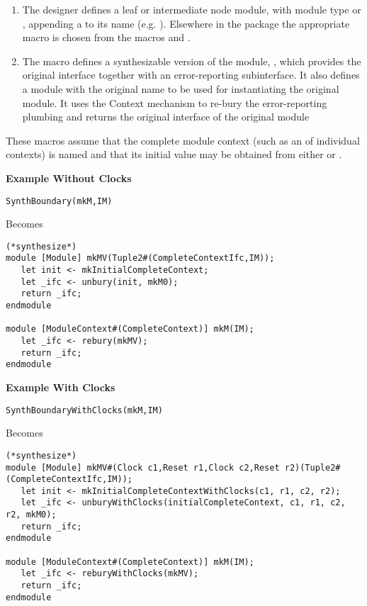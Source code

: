 \begin{enumerate}
\item The designer defines a leaf or intermediate node module, with
module type \te{[ErrorReporter]} or \te{[ErrorReporterA]}, appending a
 to its name (e.g. ).  Elsewhere in the package the
appropriate macro is chosen from the macros  and
. 

\item The macro defines a synthesizable version of the module,
, which provides the original interface together with an
error-reporting subinterface.  It also defines a module with the
original name  to be used for instantiating the original
module.  It uses the Context mechanism to re-bury the error-reporting
plumbing and returns the original interface of the original  module
\end{enumerate}

These macros assume that the complete module context (such as an
 of individual contexts) is named  and
that its initial value may be obtained from either
  or .


{\bf Example Without Clocks}

\begin{verbatim}
SynthBoundary(mkM,IM)
\end{verbatim}

Becomes
\begin{verbatim}
(*synthesize*)
module [Module] mkMV(Tuple2#(CompleteContextIfc,IM));
   let init <- mkInitialCompleteContext;
   let _ifc <- unbury(init, mkM0);
   return _ifc;
endmodule

module [ModuleContext#(CompleteContext)] mkM(IM);
   let _ifc <- rebury(mkMV);
   return _ifc;
endmodule
\end{verbatim}
{\bf Example With Clocks}
\begin{verbatim}
SynthBoundaryWithClocks(mkM,IM)
\end{verbatim}
Becomes

\begin{verbatim}
(*synthesize*)
module [Module] mkMV#(Clock c1,Reset r1,Clock c2,Reset r2)(Tuple2#(CompleteContextIfc,IM));
   let init <- mkInitialCompleteContextWithClocks(c1, r1, c2, r2);
   let _ifc <- unburyWithClocks(initialCompleteContext, c1, r1, c2, r2, mkM0);
   return _ifc;
endmodule

module [ModuleContext#(CompleteContext)] mkM(IM);
   let _ifc <- reburyWithClocks(mkMV);
   return _ifc;
endmodule
\end{verbatim}
